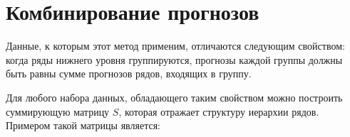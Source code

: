 \documentclass[12pt,a4paper, oneside]{extreport}
\begin{document}
%
%
%
%
%
%
%

\section{Комбинирование прогнозов}


Данные, к которым этот метод применим, отличаются следующим свойством: 
когда ряды нижнего уровня  группируются, прогнозы каждой группы должны быть равны сумме прогнозов рядов, входящих в  группу.

Для любого набора данных, обладающего  таким свойством можно построить суммирующую матрицу $S$, которая отражает  структуру иерархии рядов. 
Примером такой матрицы является:
\end{document}

